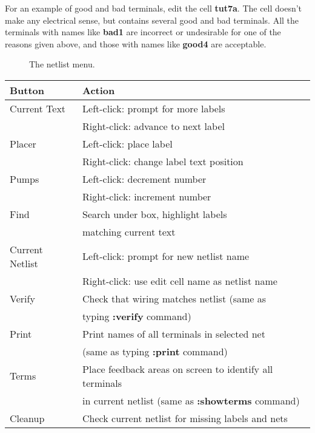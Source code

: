 \documentclass[letterpaper,twoside,12pt]{article}
\begin{document}
For an example of good and bad terminals, edit the cell {\bfseries tut7a}.
The cell doesn't
make any electrical sense, but contains several good and bad
terminals.
All the terminals with names like {\bfseries bad1} are incorrect or
undesirable for one of the reasons given above, and those with
names like {\bfseries good4} are acceptable.

\begin{figure}[ht]
   \begin{center}
      \caption{The netlist menu.}
   \end{center}
\end{figure}

\begin{table}[ht]
   \begin{center}
      \begin{tabular}{|l|l|} \hline
	Button	& Action \\ \hline
	Current Text	& Left-click:  prompt for more labels \\
			& Right-click:  advance to next label \\ \hline
	Placer		& Left-click:  place label \\
			& Right-click:  change label text position \\ \hline
	Pumps		& Left-click:  decrement number \\
			& Right-click:  increment number \\ \hline
	Find		& Search under box, highlight labels \\
			& matching current text \\ \hline
	Current Netlist	& Left-click:  prompt for new netlist name \\
			& Right-click:  use edit cell name as netlist name \\ \hline
	Verify		& Check that wiring matches netlist (same as \\
			& typing {\bfseries :verify} command) \\ \hline
	Print		& Print names of all terminals in selected net \\
			& (same as typing {\bfseries :print} command) \\ \hline
	Terms		& Place feedback areas on screen to identify all terminals \\
			& in current netlist (same as {\bfseries :showterms} command) \\
				\hline
	Cleanup		& Check current netlist for missing labels and nets \\

\end{tabular}
\end{center}
\end{table}
\end{document}
